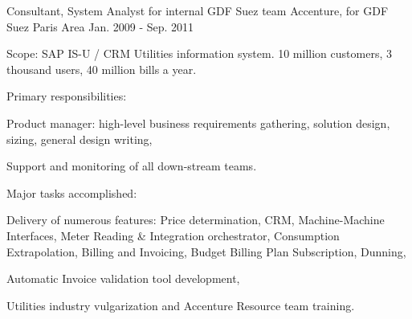 \begin{cventries}
  \cventry
    {Consultant, System Analyst for internal GDF Suez team} %
    {Accenture, for GDF Suez} %
    {Paris Area} %
    {Jan. 2009 - Sep. 2011} %
    {
      \begin{cvitems} %
        \item {Scope: SAP IS-U / CRM Utilities information system. 10 million customers, 3 thousand users, 40 million bills a year.}
        \item {Primary responsibilities:}
        \begin{cvsubitems}
          \item {Product manager: high-level business requirements gathering, solution design, sizing, general design writing,}
          \item {Support and monitoring of all down-stream teams.}
        \end{cvsubitems}
        \item {Major tasks accomplished:}
        \begin{cvsubitems}
          \item {Delivery of numerous features: Price determination, CRM, Machine-Machine Interfaces, Meter Reading \& Integration orchestrator, Consumption Extrapolation, Billing and Invoicing, Budget Billing Plan Subscription, Dunning,}
          \item {Automatic Invoice validation tool development,}
          \item {Utilities industry vulgarization and Accenture Resource team training.}
        \end{cvsubitems}
      \end{cvitems}
    }


\end{cventries}
